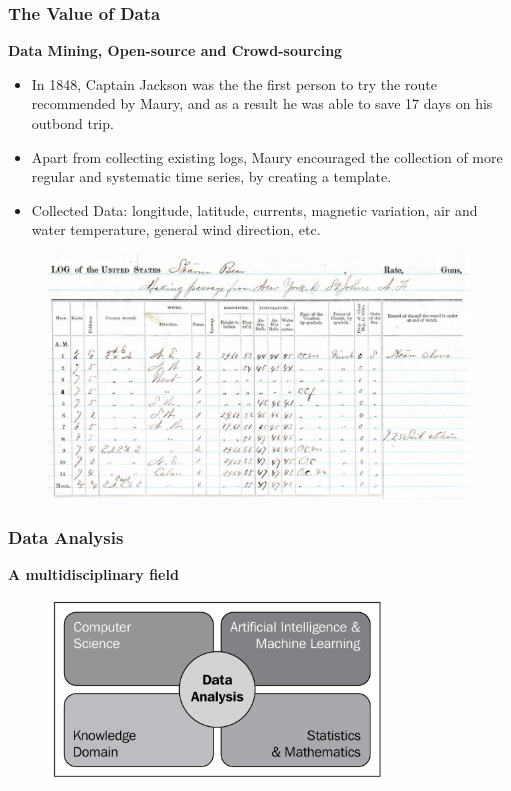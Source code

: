 \documentclass[hyperref={pdfpagelabels=true}]{beamer}
\begin{document}
\begin{frame}
\frametitle{The Value of Data}
\textbf{Data Mining, Open-source and Crowd-sourcing}
\small{
    \begin{itemize}
      \item<2->In 1848, Captain Jackson was the the first person to try the route recommended by Maury, and as a result he was able to save 17 days on his outbond trip.
      \item<3->Apart from collecting existing logs, Maury encouraged the collection of more regular and systematic time series, by creating a template.
      \item<4->Collected Data: longitude, latitude, currents, magnetic variation, air and water temperature, general wind direction, etc.      
      \end{itemize}
}
    \begin{figure}
      \includegraphics[scale=0.15]{log.jpg}
     \end{figure}
\end{frame}

\begin{frame}
\frametitle{Data Analysis}
\textbf{A multidisciplinary field}
    \begin{figure}
      \includegraphics[width=0.8\textwidth]{data_analysis.png}
     \end{figure}
\end{frame}
\end{document}
